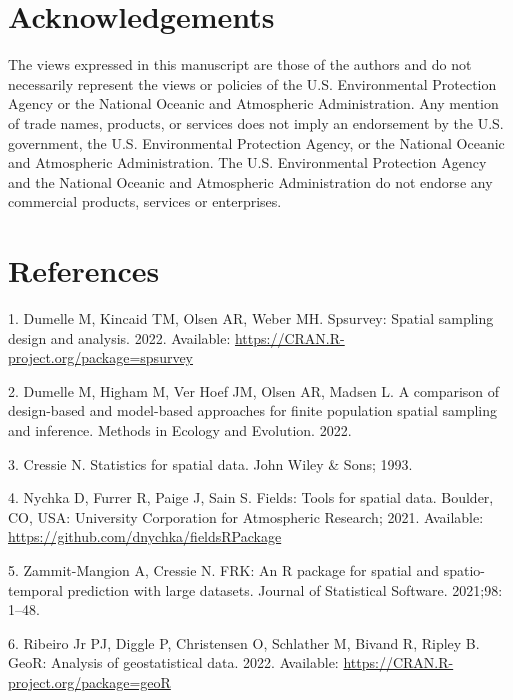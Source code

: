 \documentclass[10pt,letterpaper]{article}
\begin{document}
\hypertarget{acknowledgements}{%
\section*{Acknowledgements}\label{acknowledgements}}

The views expressed in this manuscript are those of the authors and do
not necessarily represent the views or policies of the U.S.
Environmental Protection Agency or the National Oceanic and Atmospheric
Administration. Any mention of trade names, products, or services does
not imply an endorsement by the U.S. government, the U.S. Environmental
Protection Agency, or the National Oceanic and Atmospheric
Administration. The U.S. Environmental Protection Agency and the
National Oceanic and Atmospheric Administration do not endorse any
commercial products, services or enterprises.

\hypertarget{references}{%
\section*{References}\label{references}}

\hypertarget{refs}{}
\leavevmode\hypertarget{ref-dumelle2022spsurvey}{}%
1. Dumelle M, Kincaid TM, Olsen AR, Weber MH. Spsurvey: Spatial sampling
design and analysis. 2022. Available:
\url{https://CRAN.R-project.org/package=spsurvey}

\leavevmode\hypertarget{ref-dumelle2022comparison}{}%
2. Dumelle M, Higham M, Ver Hoef JM, Olsen AR, Madsen L. A comparison of
design-based and model-based approaches for finite population spatial
sampling and inference. Methods in Ecology and Evolution. 2022.

\leavevmode\hypertarget{ref-cressie1993statistics}{}%
3. Cressie N. Statistics for spatial data. John Wiley \& Sons; 1993.

\leavevmode\hypertarget{ref-nychka2021fields}{}%
4. Nychka D, Furrer R, Paige J, Sain S. Fields: Tools for spatial data.
Boulder, CO, USA: University Corporation for Atmospheric Research; 2021.
Available: \url{https://github.com/dnychka/fieldsRPackage}

\leavevmode\hypertarget{ref-zammitmangion2021FRK}{}%
5. Zammit-Mangion A, Cressie N. FRK: An R package for spatial and
spatio-temporal prediction with large datasets. Journal of Statistical
Software. 2021;98: 1--48.

\leavevmode\hypertarget{ref-ribiero2022geoR}{}%
6. Ribeiro Jr PJ, Diggle P, Christensen O, Schlather M, Bivand R, Ripley
B. GeoR: Analysis of geostatistical data. 2022. Available:
\url{https://CRAN.R-project.org/package=geoR}
\end{document}
